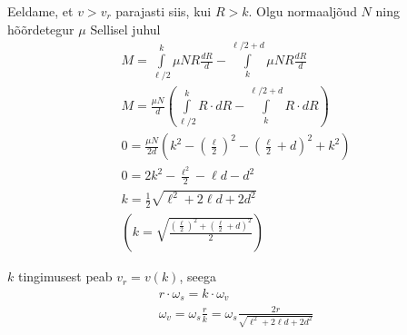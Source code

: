 Eeldame, et $v > v_r$ parajasti siis, kui $R > k$. Olgu normaaljõud $N$ ning hõõrdetegur $\mu$ Sellisel juhul
\begin{gather*}
    M = \int\limits_{\ell / 2}^{k} \mu N R \frac{dR}{d} - \int\limits_{k}^{\ell/2 + d} \mu N R \frac{dR}{d} \\
    M = \frac{\mu N}{d} \left ( \int\limits_{\ell / 2}^{k} R \cdot dR - \int\limits_{k}^{\ell/2 + d} R \cdot dR \right ) \\
    0 = \frac{\mu N}{2 d} \left ( k^2 - \left ( \frac{\ell}{2} \right )^2 - \left ( \frac{\ell}{2} + d \right )^2 + k^2 \right ) \\
    0 = 2 k^2 - \frac{\ell^2}{2} - \ell d - d^2 \\
    k = \frac{1}{2} \sqrt{\ell^2 + 2 \ell d + 2 d^2} \\
    \left ( k = \sqrt{\frac{\left ( \frac{\ell}{2}\right )^2 + \left ( \frac{\ell}{2} + d \right )^2}{2}}\right )
\end{gather*}

$k$ tingimusest peab $v_r = v(k)$, seega
\begin{gather*}
    r \cdot \omega_s = k \cdot \omega_v \\
    \omega_v = \omega_s \frac{r}{k} = \omega_s \frac{2r}{\sqrt{\ell^2 + 2 \ell d + 2 d^2}}
\end{gather*}
\probend
